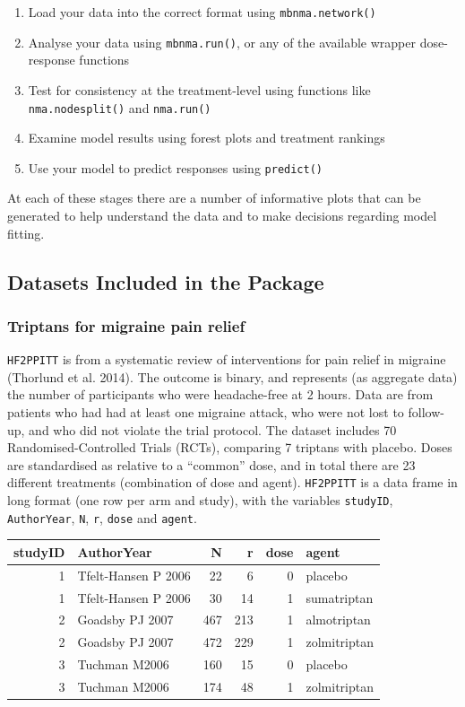\documentclass[]{article}
\providecommand{\tightlist}{%
  \setlength{\itemsep}{0pt}\setlength{\parskip}{0pt}}
\begin{document}
\begin{enumerate}
\def\labelenumi{\arabic{enumi}.}
\tightlist
\item
  Load your data into the correct format using \texttt{mbnma.network()}
\item
  Analyse your data using \texttt{mbnma.run()}, or any of the available
  wrapper dose-response functions
\item
  Test for consistency at the treatment-level using functions like
  \texttt{nma.nodesplit()} and \texttt{nma.run()}
\item
  Examine model results using forest plots and treatment rankings
\item
  Use your model to predict responses using \texttt{predict()}
\end{enumerate}

At each of these stages there are a number of informative plots that can
be generated to help understand the data and to make decisions regarding
model fitting.

\hypertarget{datasets-included-in-the-package}{%
\subsection{Datasets Included in the
Package}\label{datasets-included-in-the-package}}

\hypertarget{triptans-for-migraine-pain-relief}{%
\subsubsection{Triptans for migraine pain
relief}\label{triptans-for-migraine-pain-relief}}

\texttt{HF2PPITT} is from a systematic review of interventions for pain
relief in migraine (Thorlund et al. 2014). The outcome is binary, and
represents (as aggregate data) the number of participants who were
headache-free at 2 hours. Data are from patients who had had at least
one migraine attack, who were not lost to follow-up, and who did not
violate the trial protocol. The dataset includes 70
Randomised-Controlled Trials (RCTs), comparing 7 triptans with placebo.
Doses are standardised as relative to a ``common'' dose, and in total
there are 23 different treatments (combination of dose and agent).
\texttt{HF2PPITT} is a data frame in long format (one row per arm and
study), with the variables \texttt{studyID}, \texttt{AuthorYear},
\texttt{N}, \texttt{r}, \texttt{dose} and \texttt{agent}.

\begin{longtable}[]{@{}rlrrrl@{}}
\toprule
studyID & AuthorYear & N & r & dose & agent\tabularnewline
\midrule
\endhead
1 & Tfelt-Hansen P 2006 & 22 & 6 & 0 & placebo\tabularnewline
1 & Tfelt-Hansen P 2006 & 30 & 14 & 1 & sumatriptan\tabularnewline
2 & Goadsby PJ 2007 & 467 & 213 & 1 & almotriptan\tabularnewline
2 & Goadsby PJ 2007 & 472 & 229 & 1 & zolmitriptan\tabularnewline
3 & Tuchman M2006 & 160 & 15 & 0 & placebo\tabularnewline
3 & Tuchman M2006 & 174 & 48 & 1 & zolmitriptan\tabularnewline
\bottomrule
\end{longtable}
\end{document}
